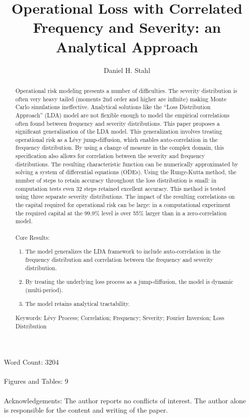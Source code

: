 \documentclass{article}
\theoremstyle{definition}
\begin{document}
\title{Operational Loss with Correlated Frequency and Severity: an Analytical Approach}
\date{}
\author{Daniel H. Stahl}

\maketitle
Word Count: 3204
\\
\\
Figures and Tables: 9
\\
\\
Acknowledgements: The author reports no conflicts of interest.  The author alone is responsible for the content and writing of the paper.
\newpage
 \begin{abstract}
Operational risk modeling presents a number of difficulties. The severity distribution is often very heavy tailed (moments 2nd order and higher are infinite) making Monte Carlo simulations ineffective.  Analytical solutions like the ``Loss Distribution Approach'' (LDA) model are not flexible enough to model the empirical correlations often found between frequency and severity distributions.  This paper proposes a significant generalization of the LDA model.  This generalization involves treating operational risk as a L\'evy jump-diffusion, which enables auto-correlation in the frequency distribution.  By using a change of measure in the complex domain, this specification also allows for correlation between the severity and frequency distributions. The resulting characteristic function can be numerically approximated by solving a system of differential equations (ODEs).  Using the Runge-Kutta method, the number of steps to retain accuracy throughout the loss distribution is small: in computation tests even 32 steps retained excellent accuracy. This method is tested using three separate severity distributions.  The impact of the resulting correlations on the capital required for operational risk can be large:  in a computational experiment the required capital at the 99.9\% level is over 55\% larger than in a zero-correlation model.  
\\
\\
Core Results:
\begin{enumerate}
\item The model generalizes the LDA framework to include auto-correlation in the frequency distribution and correlation between the frequency and severity distribution.
\item By treating the underlying loss process as a jump-diffusion, the model is dynamic (multi-period).
\item The model retains analytical tractability.
\end{enumerate}

Keywords: L\'evy Process; Correlation; Frequency; Severity; Fourier Inversion; Loss Distribution
\end{abstract}
\end{document}
